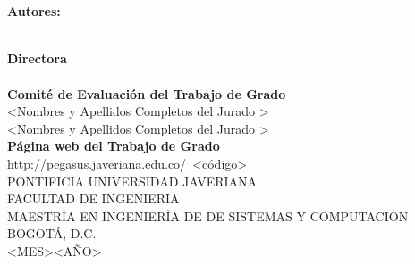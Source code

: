 \thispagestyle{empty}

\begin{center}

		\fontsize{12pt}{12pt}\textbf{\CODIGOTG\ }\\
		\fontsize{14pt}{14pt}\selectfont \TITULOTG\ \\ %
		\vspace*{2cm}
		\fontsize{12pt}{12pt}\textbf{Autores:}\\ 
		\vspace{0.2cm}
		\fontsize{14pt}{14pt} \AUTORESTG\ \\
        \vspace*{3cm}

        \vspace*{1.7cm}
		\fontsize{12pt}{12pt}\textbf{Directora}\\
		\vspace{0.2cm}
        \DIRECTORTG\ \\
        \vspace{0.2cm}
        \textbf{Comité de Evaluación del Trabajo de Grado}\\
        \vspace{0.2cm}
        <Nombres y Apellidos Completos del Jurado >\\
        \vspace{0.2cm}
        <Nombres y Apellidos Completos del Jurado >\\
        \vspace{0.2cm}
        \textbf{Página web del Trabajo de Grado}\\
        \vspace{0.2cm}
        http://pegasus.javeriana.edu.co/~<código>\\

		\vspace*{1.8cm}
		\fontsize{12pt}{12pt}\selectfont PONTIFICIA UNIVERSIDAD JAVERIANA\\
		FACULTAD DE INGENIERIA\\
		MAESTRÍA EN INGENIERÍA DE DE SISTEMAS Y COMPUTACIÓN\\
		BOGOTÁ, D.C.\\
		<MES><AÑO> %
\end{center}